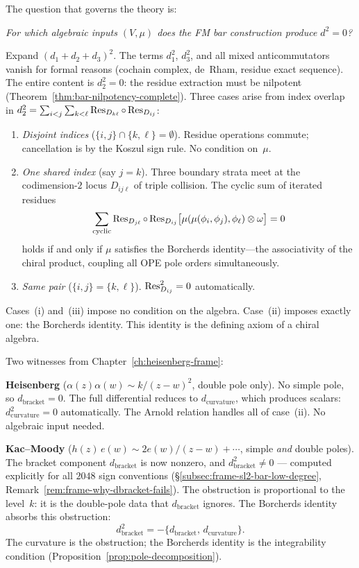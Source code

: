 The question that governs the theory is:
\begin{center}
\emph{For which algebraic inputs $(V, \mu)$ does
the FM bar construction produce $d^2 = 0$?}
\end{center}

\noindent
Expand $(d_1 + d_2 + d_3)^2$.  The terms
$d_1^2$, $d_3^2$, and all mixed anticommutators vanish
for formal reasons (cochain complex, de~Rham,
residue exact sequence).  The entire content is
$d_2^2 = 0$: the residue extraction must be nilpotent
(Theorem~\ref{thm:bar-nilpotency-complete}).
Three cases arise from index overlap in
$d_2^2 = \sum_{i<j}\sum_{k<\ell}
\operatorname{Res}_{D_{k\ell}} \circ \operatorname{Res}_{D_{ij}}$:
\begin{enumerate}[label=\textup{(\roman*)}]
\item \emph{Disjoint indices}
  ($\{i,j\} \cap \{k,\ell\} = \emptyset$).
  Residue operations commute; cancellation is by the
  Koszul sign rule.  No condition on~$\mu$.

\item \emph{One shared index} (say $j = k$).
  Three boundary strata meet at the codimension-$2$ locus
  $D_{ij\ell}$ of triple collision.  The cyclic sum of
  iterated residues
  \[
  \sum_{\textup{cyclic}}
    \operatorname{Res}_{D_{j\ell}} \circ \operatorname{Res}_{D_{ij}}
    \bigl[\mu(\mu(\phi_i, \phi_j), \phi_\ell)
    \otimes \omega\bigr]
  = 0
  \]
  holds if and only if $\mu$ satisfies the
  Borcherds identity---the associativity of the chiral
  product, coupling all OPE pole orders simultaneously.

\item \emph{Same pair}
  ($\{i,j\} = \{k,\ell\}$).
  $\operatorname{Res}_{D_{ij}}^2 = 0$ automatically.
\end{enumerate}
Cases~(i) and~(iii) impose no condition on the algebra.
Case~(ii) imposes exactly one: the Borcherds identity.
This identity is the defining axiom of a chiral algebra.

Two witnesses from Chapter~\ref{ch:heisenberg-frame}:

\smallskip\noindent\textbf{Heisenberg} ($\alpha(z)\alpha(w) \sim
k/(z-w)^2$, double pole only).  No simple pole, so
$d_{\mathrm{bracket}} = 0$.  The full differential reduces to
$d_{\mathrm{curvature}}$, which produces scalars:
$d_{\mathrm{curvature}}^2 = 0$ automatically.  The Arnold
relation handles all of case~(ii).  No algebraic input needed.

\smallskip\noindent\textbf{Kac--Moody} ($h(z)\,e(w) \sim
2e(w)/(z-w) + \cdots$, simple \emph{and} double poles).
The bracket component $d_{\mathrm{bracket}}$ is now nonzero, and
$d_{\mathrm{bracket}}^2 \neq 0$ --- computed explicitly for all
$2048$ sign conventions
(\S\ref{subsec:frame-sl2-bar-low-degree},
Remark~\ref{rem:frame-why-dbracket-fails}).  The obstruction is
proportional to the level~$k$: it is the double-pole data that
$d_{\mathrm{bracket}}$ ignores.  The Borcherds identity absorbs
this obstruction:
\[
d_{\mathrm{bracket}}^2
= -\{d_{\mathrm{bracket}},\, d_{\mathrm{curvature}}\}.
\]
The curvature is the obstruction; the Borcherds identity is the
integrability condition
(Proposition~\ref{prop:pole-decomposition}).

